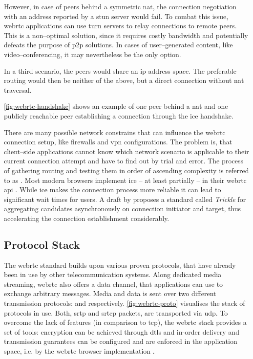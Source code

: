 However, in case of peers behind a symmetric \gls{nat}, the connection negotiation with an address reported by a \gls{stun} server would fail. To combat this issue, \gls{webrtc} applications can use \gls{turn} servers to relay connections to remote peers. This is a non–optimal solution, since it requires costly bandwidth and potentially defeats the purpose of \gls{p2p} solutions. In cases of user–generated content, like video–conferencing, it may nevertheless be the only option.

In a third scenario, the peers would share an \gls{ip} address space. The preferable routing would then be neither of the above, but a direct connection without \gls{nat} traversal.

\vref{fig:webrtc-handshake} shows an example of one peer behind a \gls{nat} and one publicly reachable peer establishing a connection through the \gls{ice} handshake.

There are many possible network constrains that can influence the \gls{webrtc} connection setup, like firewalls and \gls{vpn} configurations. The problem is, that client–side applications cannot know which network scenario is applicable to their current connection attempt and have to find out by trial and error. The process of gathering routing  and testing them in order of ascending complexity is referred to as  \cite{ice-rfc}. Most modern browsers implement \gls{ice} – at least partially – in their \gls{webrtc} \gls{api} \cite{webrtc-browser-compat}. While \gls{ice} makes the connection process more reliable it can lead to significant wait times for users. A draft by \citet{trickle-ice} proposes a standard called \textit{Trickle} for aggregating candidates asynchronously on connection initiator and target, thus accelerating the connection establishment considerably.

\subsection{Protocol Stack}\label{par:webrtc-stack}
The \gls{webrtc} standard builds upon various proven protocols, that have already been in use by other telecommunication systems. Along dedicated media streaming, \gls{webrtc} also offers a data channel, that applications can use to exchange arbitrary messages. Media and data is sent over two different transmission protocols:  and  respectively. \vref{fig:webrtc-proto} visualises the stack of protocols in use. Both, \gls{srtp} and \gls{srtcp} packets, are transported via \gls{udp}. To overcome the lack of features (in comparison to \gls{tcp}), the \gls{webrtc} stack provides a set of tools: encryption can be achieved through \gls{dtls} and in-order delivery and transmission guarantees can be configured and are enforced in the application space, i.e. by the \gls{webrtc} browser implementation \cite[p. 319]{high-performance-browser-networking}.

